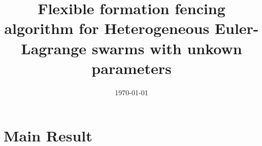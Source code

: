 \documentclass{article}
\title{Flexible formation fencing algorithm for Heterogeneous Euler-Lagrange swarms with unkown parameters}
\author{}
\date{\today}
\theoremstyle{plain}
\theoremstyle{remark}
\begin{document}
\maketitle




\section{Main Result}
\label{sec result}







% 






\end{document}
